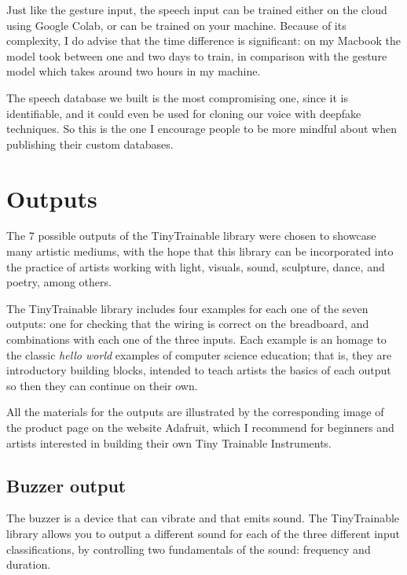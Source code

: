 Just like the gesture input, the speech input can be trained either on the cloud using Google Colab, or can be trained on your machine. Because of its complexity, I do advise that the time difference is significant: on my Macbook the model took between one and two days to train, in comparison with the gesture model which takes around two hours in my machine.

The speech database we built is the most compromising one, since it is identifiable, and it could even be used for cloning our voice with deepfake techniques. So this is the one I encourage people to be more mindful about when publishing their custom databases.

\section{Outputs}

The 7 possible outputs of the TinyTrainable library were chosen to showcase many artistic mediums, with the hope that this library can be incorporated into the practice of artists working with light, visuals, sound, sculpture, dance, and poetry, among others.

The TinyTrainable library includes four examples for each one of the seven outputs: one for checking that the wiring is correct on the breadboard, and combinations with each one of the three inputs. Each example is an homage to the classic \emph{hello world} examples of computer science education; that is, they are introductory building blocks, intended to teach artists the basics of each output so then they can continue on their own.

All the materials for the outputs are illustrated by the corresponding image of the product page on the website Adafruit, which I recommend for beginners and artists interested in building their own Tiny Trainable Instruments.

\subsection{Buzzer output}

The buzzer is a device that can vibrate and that emits sound. The TinyTrainable library allows you to output a different sound for each of the three different input classifications, by controlling two fundamentals of the sound: frequency and duration.


